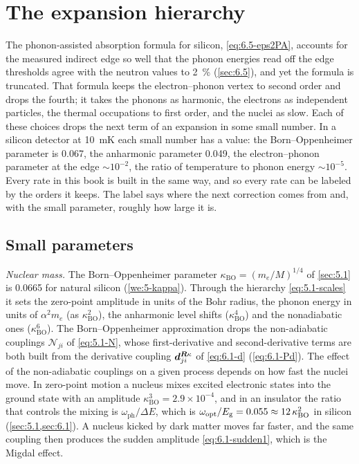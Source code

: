 \section{The expansion hierarchy}\label{sec:8.5}

The phonon-assisted absorption formula for silicon, \cref{eq:6.5-eps2PA}, accounts for the measured indirect edge so well that the phonon energies read off the edge thresholds agree with the neutron values to \SI{2}{\percent} (\cref{sec:6.5}), and yet the formula is truncated. That formula keeps the electron--phonon vertex to second order and drops the fourth; it takes the phonons as harmonic, the electrons as independent particles, the thermal occupations to first order, and the nuclei as slow. Each of these choices drops the next term of an expansion in some small number. In a silicon detector at \SI{10}{mK} each small number has a value: the Born--Oppenheimer parameter is 0.067, the anharmonic parameter 0.049, the electron--phonon parameter at the edge $\sim10^{-2}$, the ratio of temperature to phonon energy $\sim10^{-5}$. Every rate in this book is built in the same way, and so every rate can be labeled by the orders it keeps. The label says where the next correction comes from and, with the small parameter, roughly how large it is.

\subsection{Small parameters}

\emph{Nuclear mass.} The Born--Oppenheimer parameter $\kappa_{\mathrm{BO}} = (m_e/M)^{1/4}$ of \cref{sec:5.1} is 0.0665 for natural silicon (\cref{we:5-kappa}). Through the hierarchy \cref{eq:5.1-scales} it sets the zero-point amplitude in units of the Bohr radius, the phonon energy in units of $\alpha^2m_e$ (as $\kappa_{\mathrm{BO}}^2$), the anharmonic level shifts ($\kappa_{\mathrm{BO}}^4$) and the nonadiabatic ones ($\kappa_{\mathrm{BO}}^6$). The Born--Oppenheimer approximation drops the non-adiabatic couplings $\mathcal{N}_{ji}$ of \cref{eq:5.1-N}, whose first-derivative and second-derivative terms are both built from the derivative coupling $\bm{d}^{\bm{R}\kappa}_{ji}$ of \cref{eq:6.1-d} (\cref{eq:6.1-Pd}). The effect of the non-adiabatic couplings on a given process depends on how fast the nuclei move. In zero-point motion a nucleus mixes excited electronic states into the ground state with an amplitude $\kappa_{\mathrm{BO}}^3 = 2.9\times10^{-4}$, and in an insulator the ratio that controls the mixing is $\omega_{\mathrm{ph}}/\Delta E$, which is $\omega_{\mathrm{opt}}/E_{\mathrm{g}} = 0.055 \approx 12\,\kappa_{\mathrm{BO}}^2$ in silicon (\cref{sec:5.1,sec:6.1}). A nucleus kicked by dark matter moves far faster, and the same coupling then produces the sudden amplitude \cref{eq:6.1-sudden1}, which is the Migdal effect.


